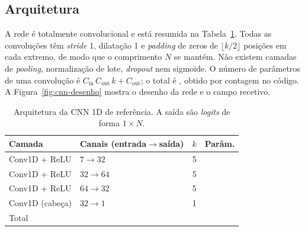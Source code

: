 \documentclass{article}
\newcommand{\rv}[1]{#1}
\begin{document}
\subsection{\texorpdfstring{Arquitetura}{Arquitetura}}

A rede é totalmente convolucional e está resumida na Tabela~\ref{tab:cnn-arquitetura}. Todas as convoluções têm \emph{stride} 1, dilatação 1 e \emph{padding} de zeros de $\lfloor k/2\rfloor$ posições em cada extremo, de modo que o comprimento $N$ se mantém. Não existem camadas de \emph{pooling}, normalização de lote, \emph{dropout} nem sigmoide. O número de parâmetros de uma convolução é $C_\text{in}\,C_\text{out}\,k+C_\text{out}$; o total é \rv{\resModParametros}, obtido por contagem no código. A Figura~\ref{fig:cnn-desenho} mostra o desenho da rede e o campo recetivo.

\begin{table}[t]
\centering\small
\begin{tabular}{@{}llrr@{}}
\toprule
Camada & Canais (entrada$\to$saída) & $k$ & Parâm. \\
\midrule
Conv1D + ReLU & $7\to32$  & 5 & \rv{\resModParamA} \\
Conv1D + ReLU & $32\to64$ & 5 & \rv{\resModParamB} \\
Conv1D + ReLU & $64\to32$ & 5 & \rv{\resModParamC} \\
Conv1D (cabeça) & $32\to1$  & 1 & \rv{\resModParamD} \\
\midrule
Total & & & \rv{\resModParametros} \\
\bottomrule
\end{tabular}
\caption{Arquitetura da CNN 1D de referência. A saída são \emph{logits} de forma $1\times N$.}
\label{tab:cnn-arquitetura}
\end{table}
\end{document}
